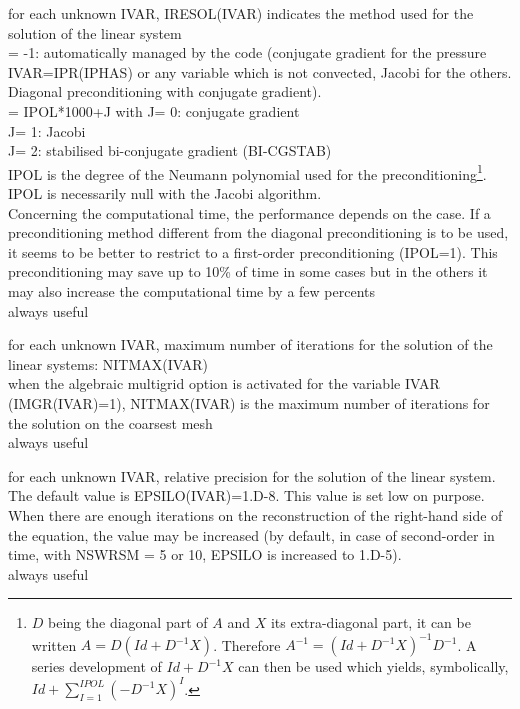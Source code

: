 {for each unknown IVAR, IRESOL(IVAR) indicates the method used for the solution of
the linear system\\
\hspace*{1.3cm}= -1: automatically managed by the code (conjugate
gradient for the pressure IVAR=IPR(IPHAS) or any variable which is not
convected, Jacobi for the others. Diagonal preconditioning with
conjugate gradient).\\
\hspace*{1.3cm}= IPOL*1000+J with           J= 0: conjugate gradient\\
\hspace*{1.3cm}\phantom{= IPOL*1000+J with} J= 1: Jacobi\\
\hspace*{1.3cm}\phantom{= IPOL*1000+J with} J= 2: stabilised bi-conjugate
gradient (BI-CGSTAB)\\
\hspace*{1.3cm}IPOL is the degree of the Neumann polynomial used for the
preconditioning\footnote{$D$ being the diagonal part of $A$ and $X$ its
extra-diagonal part, it can be written
$A=D(Id+D^{-1}X)$. Therefore \mbox{$A^{-1}=(Id+D^{-1}X)^{-1}D^{-1}$}. A series
development of $Id+D^{-1}X$ can then be used which yields, symbolically,
\mbox{$Id+\sum\limits_{I=1}^{IPOL}\left(-D^{-1}X\right)^{I}$}.}.\\
IPOL is necessarily null with the Jacobi algorithm.\\
Concerning the computational time, the performance depends on the
case. If a preconditioning method different from
the diagonal preconditioning is to be used, it seems to be better to restrict
to a first-order preconditioning (IPOL=1). This preconditioning may save up to 10\%
of time in some cases but in the others it may also increase the computational
time by a few percents\\
always useful}

{for each unknown IVAR, maximum number of iterations for the solution of
the linear systems: NITMAX(IVAR)\\
when the algebraic multigrid option is activated for the variable IVAR
(IMGR(IVAR)=1), NITMAX(IVAR) is the maximum number of iterations for the
solution on the coarsest mesh\\
always useful}

{for each unknown IVAR, relative precision for the solution of the linear
system. The default value is EPSILO(IVAR)=1.D-8. This value is set low
on purpose. When there are enough iterations on the reconstruction of the
right-hand side of the equation,
the value may be increased (by default, in case of second-order in time,
with NSWRSM = 5 or 10, EPSILO is increased to 1.D-5).\\
always useful}

